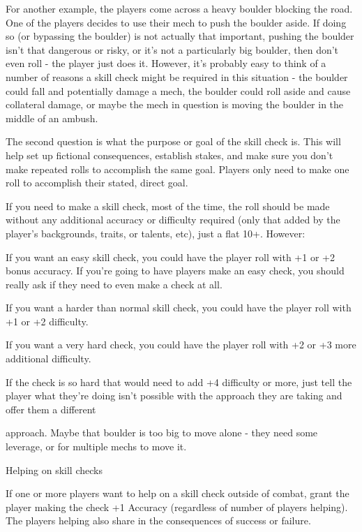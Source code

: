 For another example, the players come across a heavy boulder blocking the road. One of the  
players decides to use their mech to push the boulder aside. If doing so (or bypassing the  
boulder) is not actually that important, pushing the boulder isn’t that dangerous or risky, or it’s  
not a particularly big boulder, then don’t even roll - the player just does it. However, it’s probably  
easy to think of a number of reasons a skill check might be required in this situation - the boulder  
could fall and potentially damage a mech, the boulder could roll aside and cause collateral  
damage, or maybe the mech in question is moving the boulder in the middle of an ambush.
 

The second question is what the purpose or goal of the skill check is. This will help set up  
fictional consequences, establish stakes, and make sure you don’t make repeated rolls to  
accomplish the same goal. Players only need to make one roll to accomplish their stated, direct  
goal.
 

If you need to make a skill check, most of the time, the roll should be made without any  
additional accuracy or difficulty required (only that added by the player’s backgrounds, traits, or  
talents, etc), just a flat 10+. However:
 

If you want an easy skill check, you could have the player roll with +1 or +2 bonus accuracy. If  
you’re going to have players make an easy check, you should really ask if they need to even  
make a check at all.
 
If you want a harder than normal skill check, you could have the player roll with +1 or +2  
difficulty.
 
If you want a very hard check, you could have the player roll with +2 or +3 more additional  
difficulty.
 

If the check is so hard that would need to add +4 difficulty or more, just tell the player what  
they’re doing isn’t possible with the approach they are taking and offer them a different  

                                                                                                          


approach. Maybe that boulder is too big to move alone - they need some leverage, or for  
multiple mechs to move it.
 

                                          Helping on skill checks
 

If one or more players want to help on a skill check outside of combat, grant the player making  
the check +1 Accuracy (regardless of number of players helping). The players helping also share  
in the consequences of success or failure.
 

